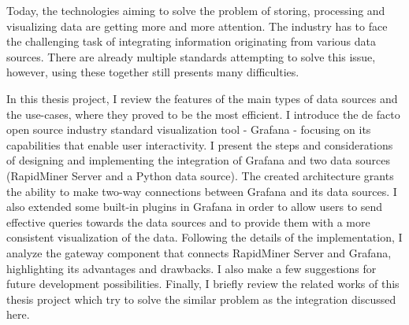 Today, the technologies aiming to solve the problem of storing, processing and visualizing data are getting more and more attention. The industry has to face the challenging task of integrating information originating from various data sources. There are already multiple standards attempting to solve this issue, however, using these together still presents many difficulties.

In this thesis project, I review the features of the main types of data sources and the use-cases, where they proved to be the most efficient. I introduce the de facto open source industry standard visualization tool - Grafana - focusing on its capabilities that enable user interactivity. I present the steps and considerations of designing and implementing the integration of Grafana and two data sources (RapidMiner Server and a Python data source). The created architecture grants the ability to make two-way connections between Grafana and its data sources. I also extended some built-in plugins in Grafana in order to allow users to send effective queries towards the data sources and to provide them with a more consistent visualization of the data. Following the details of the implementation, I analyze the gateway component that connects RapidMiner Server and Grafana, highlighting its advantages and drawbacks. I also make a few suggestions for future development possibilities. Finally, I briefly review the related works of this thesis project which try to solve the similar problem as the integration discussed here.


\vfill
\selectthesislanguage

\setcounter{romanPage}{\value{page}}
